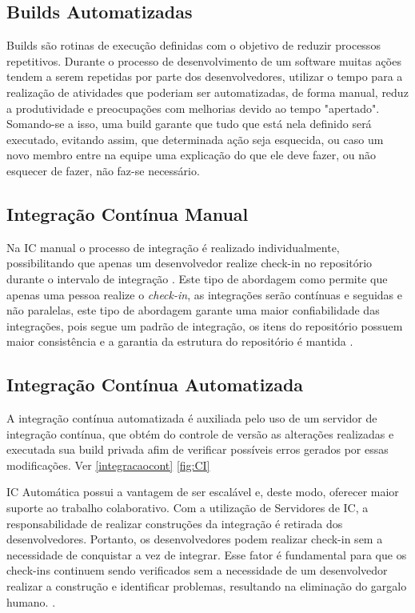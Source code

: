 \subsection{Builds Automatizadas}
Builds são rotinas de execução definidas com o objetivo de reduzir processos repetitivos. Durante o processo de desenvolvimento de um software muitas ações tendem a serem repetidas por parte dos desenvolvedores, utilizar o tempo para a realização  de atividades que poderiam ser automatizadas, de forma manual, reduz a produtividade e preocupações com melhorias devido ao tempo "apertado". Somando-se a isso, uma build garante que tudo que está nela definido será executado, evitando assim, que determinada ação seja esquecida, ou caso um novo membro entre na equipe uma explicação do que ele deve fazer, ou não esquecer de fazer, não faz-se necessário.

\subsection{Integração Contínua Manual}
Na IC manual o processo de integração é realizado individualmente, possibilitando que 
apenas um desenvolvedor realize check-in no repositório durante o intervalo de integração . Este tipo de abordagem como permite que apenas uma pessoa realize o \textit{check-in}, as integrações serão contínuas e seguidas e não paralelas, este tipo de abordagem garante uma maior confiabilidade das integrações, pois segue um padrão de integração, os itens do repositório possuem maior consistência e a garantia da estrutura do repositório é mantida \cite{gleiph2011}.

\subsection{Integração Contínua Automatizada}
A integração contínua automatizada é auxiliada pelo uso de um servidor de integração contínua, que obtém do controle de versão as alterações realizadas e executada sua build privada afim de verificar possíveis erros gerados por essas modificações. Ver \autoref{integracaocont} \autoref{fig:CI} 
\begin{citacao}
IC Automática possui a vantagem de ser escalável 
e,  deste  modo,  oferecer  maior  suporte  ao  trabalho  colaborativo.  Com  a  utilização  de 
Servidores  de  IC,  a  responsabilidade  de  realizar  construções  da  integração  é  retirada  dos desenvolvedores. Portanto, os desenvolvedores podem realizar  check-in  sem a necessidade de 
conquistar a vez de integrar. Esse fator é fundamental para que os  check-ins  continuem sendo 
verificados  sem  a  necessidade  de  um desenvolvedor  realizar  a  construção  e identificar 
problemas, resultando na eliminação do gargalo humano. . 
\end{citacao}



